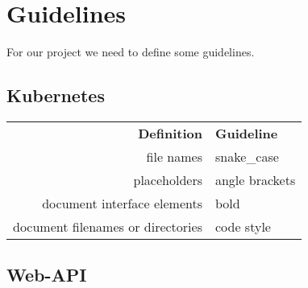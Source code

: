\chapter{Guidelines}
For our project we need to define some guidelines.

\section{Kubernetes}
\begin{tabular}{r|l}
    \textbf{Definition} & \textbf{Guideline} \\
    file names & snake\_case \\
    placeholders & angle brackets \\
    document interface elements & bold \\
    document filenames or directories & code style \\
\end{tabular}

\section{Web-API}
